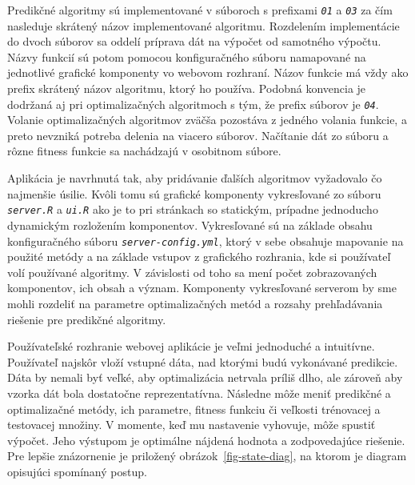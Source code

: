\documentclass[a4paper,slovak,12pt,appendix]{article}
\begin{document}
Predikčné algoritmy sú implementované v súboroch s prefixami \texttt{\textit{01}} a \texttt{\textit{03}}
za čím nasleduje skrátený názov implementované algoritmu. Rozdelením
implementácie do dvoch súborov sa oddelí príprava dát na výpočet od samotného
výpočtu. Názvy funkcií sú potom pomocou konfiguračného súboru namapované na
jednotlivé grafické komponenty vo webovom rozhraní. Názov funkcie má vždy ako
prefix skrátený názov algoritmu, ktorý ho používa. Podobná konvencia je
dodržaná aj pri optimalizačných algoritmoch s tým, že prefix súborov je \texttt{\textit{04}}.
Volanie optimalizačných algoritmov zväčša pozostáva z jedného volania funkcie,
a preto nevzniká potreba delenia na viacero súborov. Načítanie dát zo súboru
a rôzne fitness funkcie sa nachádzajú v osobitnom súbore.

Aplikácia je navrhnutá tak, aby pridávanie ďalších algoritmov vyžadovalo čo
najmenšie úsilie. Kvôli tomu sú grafické komponenty vykresľované zo súboru
\texttt{\textit{server.R}} a \texttt{\textit{ui.R}} ako je to pri stránkach so statickým, prípadne
jednoducho dynamickým rozložením komponentov. Vykresľované sú na základe obsahu
konfiguračného súboru \texttt{\textit{server-config.yml}}, ktorý v sebe obsahuje
mapovanie na použité metódy a na základe vstupov z grafického rozhrania, kde si
používateľ volí používané algoritmy. V závislosti od toho sa mení počet
zobrazovaných komponentov, ich obsah a význam. Komponenty vykresľované serverom
by sme mohli rozdeliť na parametre optimalizačných metód a rozsahy
prehľadávania riešenie pre predikčné algoritmy.

Používateľské rozhranie webovej aplikácie je veľmi jednoduché a intuitívne.
Používateľ najskôr vloží vstupné dáta, nad ktorými budú vykonávané predikcie.
Dáta by nemali byť veľké, aby optimalizácia netrvala príliš dlho, ale zároveň
aby vzorka dát bola dostatočne reprezentatívna. Následne môže meniť
predikčné a optimalizačné metódy, ich parametre, fitness funkciu či veľkosti
trénovacej a testovacej množiny. V momente, keď mu nastavenie vyhovuje, môže
spustiť výpočet. Jeho výstupom je optimálne nájdená hodnota a zodpovedajúce
riešenie. Pre lepšie znázornenie je priložený obrázok~\ref{fig-state-diag},
na ktorom je diagram opisujúci spomínaný postup.
\end{document}
